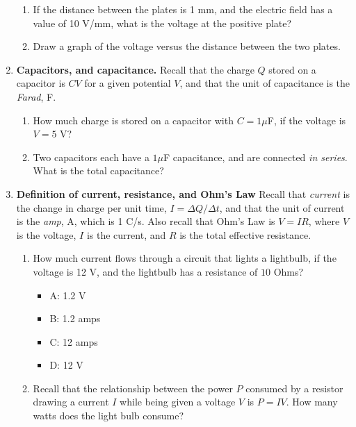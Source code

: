 \documentclass[10pt]{article}
\begin{document}
\begin{enumerate}
\begin{enumerate}
\item 	If the distance between the plates is 1 mm, and the electric field has a value of 10 V/mm, what is the voltage at the positive plate? \\ \vspace{1cm}
\item Draw a graph of the voltage versus the distance between the two plates. \\ \vspace{3cm}
\end{enumerate}
\item \textbf{Capacitors, and capacitance.} Recall that the charge $Q$ stored on a capacitor is $CV$ for a given potential $V$, and that the unit of capacitance is the \textit{Farad}, F.
\begin{enumerate}
\item How much charge is stored on a capacitor with $C = 1\mu$F, if the voltage is $V = 5$ V? \\ \vspace{0.75cm}
\item Two capacitors each have a $1\mu$F capacitance, and are connected \textit{in series}.  What is the total capacitance?  \\ \vspace{0.75cm}
\end{enumerate}
\item \textbf{Definition of current, resistance, and Ohm's Law} Recall that \textit{current} is the change in charge per unit time, $I = \Delta Q/\Delta t$, and that the unit of current is the \textit{amp}, A, which is 1 C/s.  Also recall that Ohm's Law is $V=IR$, where $V$ is the voltage, $I$ is the current, and $R$ is the total effective resistance.
\begin{enumerate}
\item How much current flows through a circuit that lights a lightbulb, if the voltage is 12 V, and the lightbulb has a resistance of $10$ Ohms?
\begin{itemize}
\item A: 1.2 V
\item B: 1.2 amps
\item C: 12 amps
\item D: 12 V
\end{itemize}
\item Recall that the relationship between the power $P$ consumed by a resistor drawing a current $I$ while being given a voltage $V$ is $P=IV$.  How many watts does the light bulb consume?
\begin{itemize}

\end{itemize}
\end{enumerate}
\end{enumerate}
\end{document}
